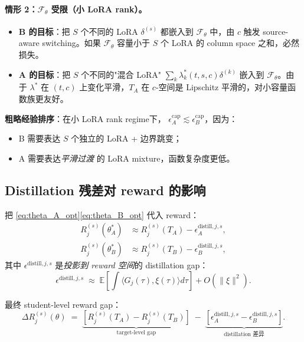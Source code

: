 \documentclass[11pt,a4paper]{article}
\newcommand{\E}{\mathbb{E}}
\theoremstyle{definition}
\begin{document}
\paragraph{情形 2：$\mathcal{F}_\theta$ 受限（小 LoRA rank）。}
\begin{itemize}[leftmargin=1.5em]
\item \textbf{B 的目标}：把 $S$ 个不同的 LoRA $\delta^{(s)}$ 都嵌入到 $\mathcal{F}_\theta$ 中，由 $c$ 触发 source-aware switching。如果 $\mathcal{F}_\theta$ 容量小于 $S$ 个 LoRA 的 column space 之和，必然损失。
\item \textbf{A 的目标}：把 $S$ 个不同的"混合 LoRA" $\sum_k \lambda_k^*(t, s, c) \delta^{(k)}$ 嵌入到 $\mathcal{F}_\theta$。由于 $\lambda^*$ 在 $(t, c)$ 上变化平滑，$T_A$ 在 $c$-空间是 Lipschitz 平滑的，对小容量函数族更友好。
\end{itemize}

\textbf{粗略经验排序}：在小 LoRA rank regime下，
$\epsilon_A^{\text{cap}} \lesssim \epsilon_B^{\text{cap}}$，因为：
\begin{itemize}[leftmargin=1.5em]
\item B 需要表达 $S$ 个独立的 LoRA + 边界跳变；
\item A 需要表达\emph{平滑过渡} 的 LoRA mixture，函数复杂度更低。
\end{itemize}

\subsection{Distillation 残差对 reward 的影响}

把 \eqref{eq:theta_A_opt}\eqref{eq:theta_B_opt} 代入 reward：
\begin{align}
R_j^{(s)}(\theta_A^*) &\approx R_j^{(s)}(T_A) - \epsilon_A^{\text{distill}, j, s}, \\
R_j^{(s)}(\theta_B^*) &\approx R_j^{(s)}(T_B) - \epsilon_B^{\text{distill}, j, s},
\end{align}
其中 $\epsilon^{\text{distill}, j, s}$ 是\emph{投影到 reward 空间}的
distillation gap：
\begin{equation}
\epsilon^{\text{distill}, j, s} \;\approx\; \E\!\left[\int \langle G_j(\tau), \xi(\tau)\rangle d\tau\right] + O(\|\xi\|^2).
\end{equation}

最终 student-level reward gap：
\begin{equation}
\boxed{
\Delta R_j^{(s)}(\theta) \;=\; \underbrace{[R_j^{(s)}(T_A) - R_j^{(s)}(T_B)]}_{\text{target-level gap}} \;-\; \underbrace{[\epsilon_A^{\text{distill}, j, s} - \epsilon_B^{\text{distill}, j, s}]}_{\text{distillation 差异}}.
}
\label{eq:full_gap}
\end{equation}
\end{document}
